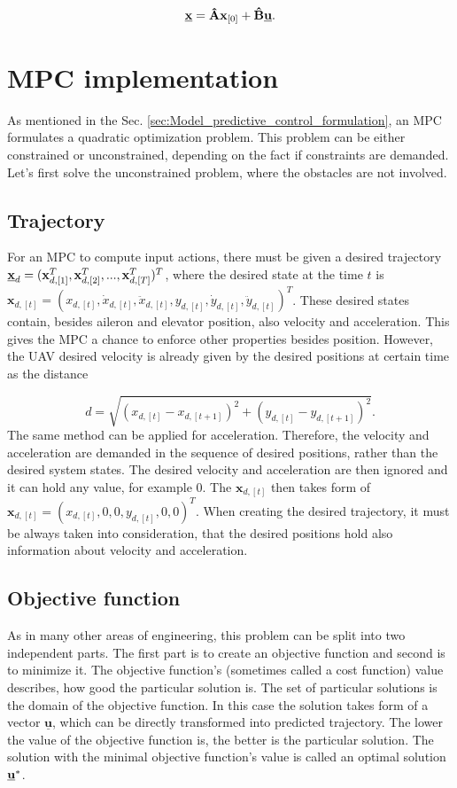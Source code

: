 \documentclass[a4paper,11pt,titlepage]{article}
\newcommand{\uvec}{\textbf{\underline{u}}}
\begin{document}
\begin{equation}
\label{eq:prediction_final}
\textbf{\underline{x}} = \textbf{\^A}\textbf{x}_{[0]} + \textbf{\^B}\uvec.
\end{equation}

\section{MPC implementation}
As mentioned in the Sec. \ref{sec:Model_predictive_control_formulation}, an MPC formulates a quadratic optimization problem. This problem can be either constrained or unconstrained, depending on the fact if constraints are demanded. Let's first solve the unconstrained problem, where the obstacles are not involved. 
\subsection{Trajectory}
For an MPC to compute input actions, there must be given a desired trajectory $\textbf{\underline{x}}_d = 
(\textbf{x}_{d,[1]}^T, \textbf{x}_{d,[2]}^T, ..., \textbf{x}_{d,[T]}^T)^T$, where the desired state at the time $t$ is $\textbf{x}_{d,[t]} = (x_{d,[t]}, \dot{x}_{d,[t]}, \ddot{x}_{d,[t]}, y_{d,[t]}, \dot{y}_{d,[t]}, \ddot{y}_{d,[t]})^T$. These desired states contain, besides aileron and elevator position, also velocity and acceleration. This gives the MPC a chance to  enforce other properties besides position. However, the UAV desired velocity is already given by the desired positions at certain time as the distance 

\begin{equation}
d = \sqrt{(x_{d,[t]}-x_{d,[t+1]})^2+ (y_{d,[t]}- y_{d,[t+1]})^2}.
\end{equation} 
The same method can be applied for acceleration. Therefore, the velocity and acceleration are demanded in the sequence of desired positions, rather than the desired system states. The desired velocity and acceleration are then ignored and it can hold any value, for example 0. The $\textbf{x}_{d,[t]}$ then takes form of $\textbf{x}_{d,[t]} = (x_{d,[t]}, 0, 0, y_{d,[t]}, 0, 0)^T$. When creating the desired trajectory, it must be always taken into consideration, that the desired positions hold also information about velocity and acceleration.

\subsection{Objective function}
\label{sec:objective_function}
As in many other areas of engineering, this problem can be split into two independent parts. The first part is to create an objective function and second is to minimize it. The objective function's (sometimes called a cost function) value describes, how good the particular solution is. The set of particular solutions is the domain of the objective function. In this case the solution takes form of a vector $\underline{\textbf{u}}$, which can be directly transformed into predicted trajectory. The lower the value of the objective function is, the better is the particular solution. The solution with the minimal objective function's value is called an optimal solution $\uvec^*$.
\end{document}
